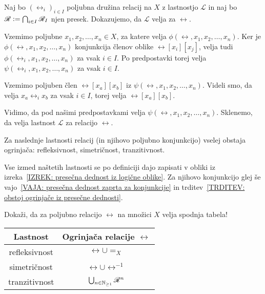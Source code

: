                 \begin{dokaz}
                        Naj bo $(\rel_i)_{i \in I}$ poljubna družina relacij na $X$ z lastnostjo $\mathscr{L}$ in naj bo $\rel \dfeq \bigcap_{i \in I} \rel_I$ njen presek. Dokazujemo, da $\mathscr{L}$ velja za $\rel$.

                        Vzemimo poljubne $x_1, x_2, \ldots, x_n \in X$, za katere velja $\phi(\rel, x_1, x_2, \ldots, x_n)$. Ker je $\phi(\rel, x_1, x_2, \ldots, x_n)$ konjunkcija členov oblike $\rel[x_i][x_j]$, velja tudi $\phi(\rel_i, x_1, x_2, \ldots, x_n)$ za vsak $i \in I$. Po predpostavki torej velja $\psi(\rel_i, x_1, x_2, \ldots, x_n)$ za vsak $i \in I$.

                        Vzemimo poljuben člen $\rel[x_a][x_b]$ iz $\psi(\rel, x_1, x_2, \ldots, x_n)$. Videli smo, da velja $x_a \mathrel{\rel_i} x_b$ za vsak $i \in I$, torej velja $\rel[x_a][x_b]$.

                        Vidimo, da pod našimi predpostavkami velja $\psi(\rel, x_1, x_2, \ldots, x_n)$. Sklenemo, da velja lastnost $\mathscr{L}$ za relacijo $\rel$.
                \end{dokaz}

                \begin{posledica}\label{POSLEDICA: obstoj ogrinjač}
                        Za naslednje lastnosti relacij (in njihovo poljubno konjunkcijo) vselej obstaja ogrinjača: refleksivnost, simetričnost, tranzitivnost.
                \end{posledica}

                \begin{dokaz}
                        Vse izmed naštetih lastnosti se po definiciji dajo zapisati v obliki iz izreka~\ref{IZREK: presečna dednost iz logične oblike}. Za njihovo konjunkcijo glej še vajo~\ref{VAJA: presečna dednost zaprta za konjunkcije} in trditev~\ref{TRDITEV: obstoj ogrinjače iz presečne dednosti}.
                \end{dokaz}

                \begin{vaja}
                        Dokaži, da za poljubno relacijo $\rel$ na množici $X$ velja spodnja tabela!
                        \begin{center}
                                \begin{tabular}{|c|c|}
                                        \hline
                                        \textbf{Lastnost} & \textbf{Ogrinjača relacije $\rel$} \\
                                        \hline
                                        refleksivnost & $\rel \cup =_X$ \\
                                        simetričnost & $\rel \cup \rel^{-1}$ \\
                                        tranzitivnost & $\bigcup_{n \in \NN_{\geq 1}} \rel^n$ \\
                                        \hline
                                \end{tabular}
                        \end{center}
                \end{vaja}

